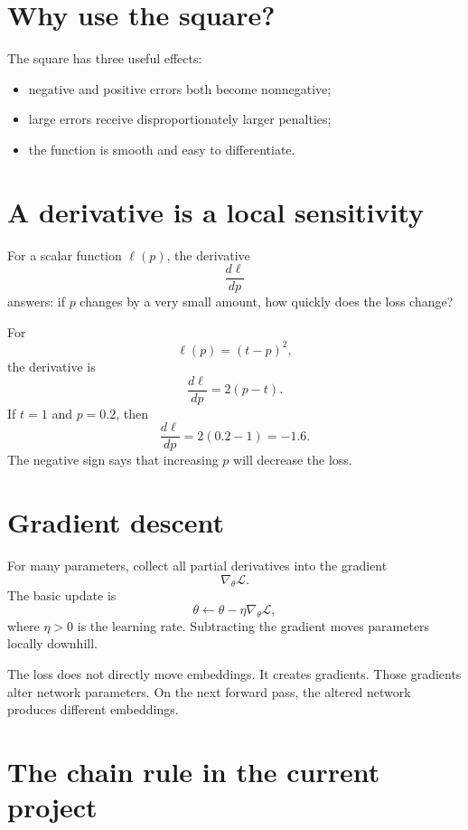 \documentclass[11pt,oneside,openany]{book}
\theoremstyle{myplain}
\theoremstyle{definition}
\begin{document}
\section{Why use the square?}

The square has three useful effects:
\begin{itemize}[leftmargin=*]
  \item negative and positive errors both become nonnegative;
  \item large errors receive disproportionately larger penalties;
  \item the function is smooth and easy to differentiate.
\end{itemize}

\section{A derivative is a local sensitivity}

For a scalar function $\ell(p)$, the derivative
\[
  \frac{d\ell}{dp}
\]
answers: if $p$ changes by a very small amount, how quickly does the loss change?

For
\[
  \ell(p)=(t-p)^2,
\]
the derivative is
\[
  \frac{d\ell}{dp}=2(p-t).
\]
If $t=1$ and $p=0.2$, then
\[
  \frac{d\ell}{dp}=2(0.2-1)=-1.6.
\]
The negative sign says that increasing $p$ will decrease the loss.

\section{Gradient descent}

For many parameters, collect all partial derivatives into the gradient
\[
  \nabla_\theta\mathcal L.
\]
The basic update is
\[
  \theta\leftarrow\theta-\eta\nabla_\theta\mathcal L,
\]
where $\eta>0$ is the learning rate. Subtracting the gradient moves parameters locally downhill.

\begin{conceptbox}[title=The role of the loss]
The loss does not directly move embeddings. It creates gradients. Those gradients alter network parameters. On the next forward pass, the altered network produces different embeddings.
\end{conceptbox}

\section{The chain rule in the current project}
\end{document}
